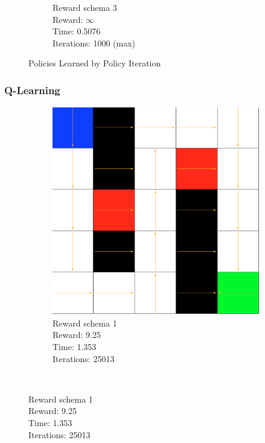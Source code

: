 \documentclass[a4paper,10pt]{article}
\begin{document}
\begin{figure}[h!]
\begin{subfigure}[b]{0.3\textwidth}
                \caption{Reward schema 3\\
                Reward: $\infty$ \\
                Time: 0.5076\\
                Iterations: 1000 (max)}
                \label{fig:mouse}
        \end{subfigure}
        \caption{Policies Learned by Policy Iteration}\label{fig:animals}
\end{figure}

\subsubsection{Q-Learning}
\begin{figure}[h!]
        \centering
        \begin{subfigure}[b]{0.3\textwidth}
                \includegraphics[width=\textwidth]{figures/5x5_qlearn_r1.png}
                \caption{Reward schema 1\\ 
                Reward:  9.25 \\
                Time:  1.353 \\
                Iterations:  25013 }
                \label{fig:gull}
        \end{subfigure}%
        ~ %

\end{figure}
\end{document}
